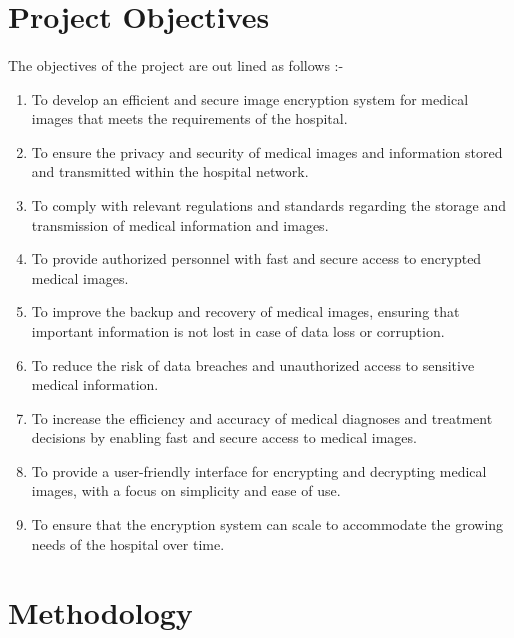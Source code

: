 \documentclass[11pt,a4paper,english]{article}
\begin{document}
\section{Project Objectives}
\paragraph{}
The objectives of the project are out lined as follows :-
\begin{enumerate}
    \item To develop an efficient and secure image encryption system for medical images that meets the requirements of the hospital.

    \item To ensure the privacy and security of medical images and information stored and transmitted within the hospital network.

    \item To comply with relevant regulations and standards regarding the storage and transmission of medical information and images.

    \item To provide authorized personnel with fast and secure access to encrypted medical images.

    \item To improve the backup and recovery of medical images, ensuring that important information is not lost in case of data loss or corruption.

    \item To reduce the risk of data breaches and unauthorized access to sensitive medical information.

    \item To increase the efficiency and accuracy of medical diagnoses and treatment decisions by enabling fast and secure access to medical images.

    \item To provide a user-friendly interface for encrypting and decrypting medical images, with a focus on simplicity and ease of use.

    \item To ensure that the encryption system can scale to accommodate the growing needs of the hospital over time.\newpage
\end{enumerate}
\section{Methodology}
\end{document}
